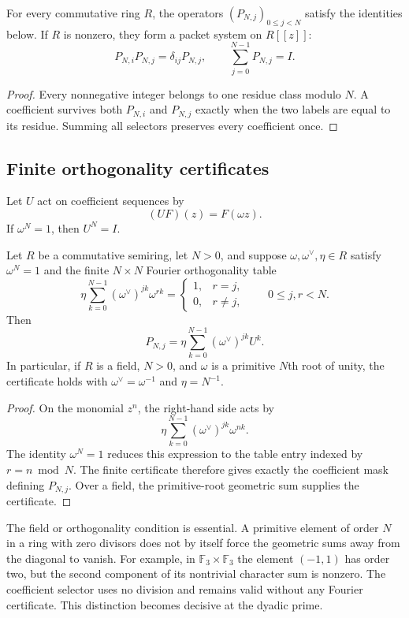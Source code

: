 \begin{proposition}\label{prop:residue_algebra}\label{prop:residue-algebra}
For every commutative ring $R$, the operators $(P_{N,j})_{0\leq j<N}$ satisfy the identities below.  If $R$ is nonzero, they form a packet system on $R[[z]]$:
\[
P_{N,i}P_{N,j}=\delta_{ij}P_{N,j},
\qquad
\sum_{j=0}^{N-1}P_{N,j}=I.
\]
\end{proposition}

\begin{proof}
Every nonnegative integer belongs to one residue class modulo $N$.  A coefficient survives both $P_{N,i}$ and $P_{N,j}$ exactly when the two labels are equal to its residue.  Summing all selectors preserves every coefficient once.
\end{proof}

\subsection{Finite orthogonality certificates}

Let $U$ act on coefficient sequences by
\[
(UF)(z)=F(\omega z).
\]
If $\omega^N=1$, then $U^N=I$.

\begin{theorem}\label{thm:root-of-unity}
Let $R$ be a commutative semiring, let $N>0$, and suppose
$\omega,\omega^\vee,\eta\in R$ satisfy $\omega^N=1$ and the finite
$N\times N$ Fourier orthogonality table
\[
\eta\sum_{k=0}^{N-1}(\omega^\vee)^{jk}\omega^{rk}
=
\begin{cases}
1,&r=j,\\
0,&r\ne j,
\end{cases}
\qquad 0\le j,r<N.
\]
Then
\[
\boxed{
P_{N,j}
=
\eta\sum_{k=0}^{N-1}(\omega^\vee)^{jk}U^k.
}
\]
In particular, if $R$ is a field, $N>0$, and $\omega$ is a primitive
$N$th root of unity, the certificate holds with
$\omega^\vee=\omega^{-1}$ and $\eta=N^{-1}$.
\end{theorem}

\begin{proof}
On the monomial $z^n$, the right-hand side acts by
\[
\eta\sum_{k=0}^{N-1}(\omega^\vee)^{jk}\omega^{nk}.
\]
The identity $\omega^N=1$ reduces this expression to the table entry indexed
by $r=n\bmod N$. The finite certificate therefore gives exactly the
coefficient mask defining $P_{N,j}$.
Over a field, the primitive-root geometric sum supplies the certificate.
\end{proof}

The field or orthogonality condition is essential. A primitive element of
order $N$ in a ring with zero divisors does not by itself force the geometric
sums away from the diagonal to vanish. For example, in $\mathbb F_3\times\mathbb F_3$ the
element $(-1,1)$ has order two, but the second component of its nontrivial
character sum is nonzero. The coefficient selector uses no division and remains valid
without any Fourier certificate. This distinction becomes decisive at the
dyadic prime.


